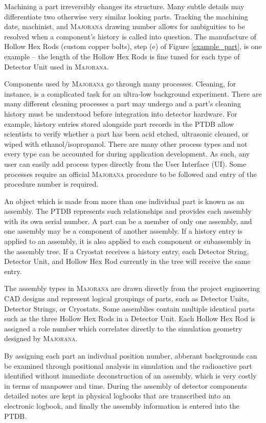 \documentclass[journal]{IEEEtran}
\begin{document}
Machining a part irreversibly changes its structure. Many subtle details may differentiate
two otherwise very similar looking parts. Tracking the machining date, machinist, and \textsc{Majorana} drawing number allows
for ambiguities to be resolved when a component's history is called into question. The manufacture of Hollow Hex Rods (custom copper bolts), step (e) of Figure \ref{example_part},
is one example -- the length of the Hollow Hex Rods is fine tuned for each type of Detector Unit used in \textsc{Majorana}.

Components used by \textsc{Majorana} go through many processes. Cleaning, for instance, is a complicated task for an ultra-low
background experiment. There are many different cleaning processes a part may undergo and a part's cleaning history
must be understood before integration into detector hardware. For example, history entries stored alongside part records in the PTDB
allow scientists to verify whether a part has been acid etched, ultrasonic cleaned, or wiped with ethanol/isopropanol.
There are many other process types and not every type can be accounted for during application development. As such, any user can 
easily add process types directly from the User Interface (UI). Some processes require an official \textsc{Majorana} procedure to be
followed and entry of the procedure number is required.

An object which is made from more than one individual
part is known as an assembly. The PTDB represents such relationships and provides each assembly with its own serial number. A part can be a member of only one assembly,
and one assembly may be a component of another assembly.
If a history entry is applied to an assembly, it is also applied to each component or sub\-assembly in the assembly tree. If a Cryostat receives
a history entry, each Detector String, Detector Unit, and Hollow Hex Rod currently in the tree will receive the same entry.

The assembly types in \textsc{Majorana} are drawn directly from the project engineering CAD designs and represent logical 
groupings of parts, such as Detector Units, Detector Strings, or Cryostats. 
Some assemblies contain multiple identical parts such as the three Hollow Hex Rods in a Detector Unit.
Each Hollow Hex Rod is assigned a role number which correlates directly to the simulation geometry designed by \textsc{Majorana}. 

By assigning each part an indivdual position number, abberant backgrounds can be examined through positional analysis in 
simulation and the radioactive part identified without immediate deconstruction of an assembly, which is very costly in 
terms of manpower and time. During the assembly of detector components detailed notes are kept in physical logbooks that are
transcribed into an electronic logbook, and finally the assembly information is entered into the PTDB.
\end{document}
